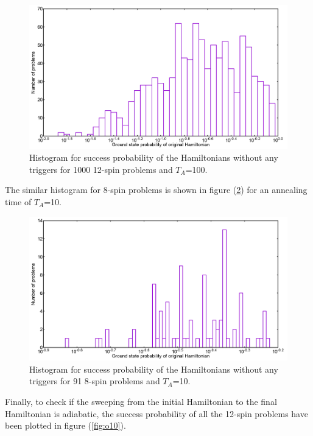 \documentclass[../main.tex]{subfiles}
\begin{document}
\begin{figure}[H]
\centering 
\includegraphics[scale=0.3]{O_s12_T100_g0.png}
\caption{Histogram for success probability of the Hamiltonians without any triggers for 1000 12-spin problems and $T_A$=100.}
\label{fig:o8}
\end{figure}
The similar histogram for 8-spin problems is shown in figure (\ref{fig:o9}) for an annealing time of $T_A$=10.
\begin{figure}[H]
\centering 
\includegraphics[scale=0.3]{O_s8_T10_g0.png}
\caption{Histogram for success probability of the Hamiltonians without any triggers for 91 8-spin problems and $T_A$=10.}
\label{fig:o9}
\end{figure}
Finally, to check if the sweeping from the initial Hamiltonian to the final Hamiltonian is adiabatic, the success probability of all the 12-spin problems have been plotted in figure (\ref{fig:o10}).
\end{document}
